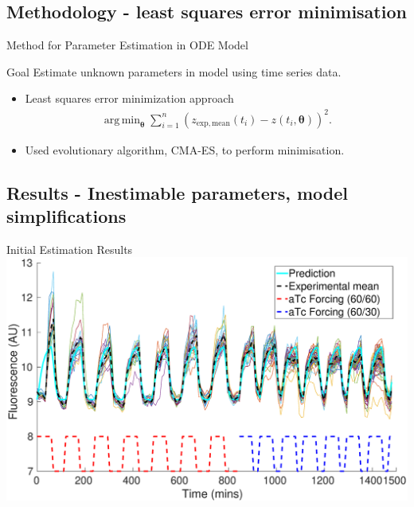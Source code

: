 \documentclass{beamer}
\DeclareMathOperator*{\argmin}{arg\,min}
\begin{document}
\subsection{Methodology - least squares error minimisation}

\begin{frame}{Method for Parameter Estimation in ODE Model}
  \begin{block}{Goal}
 Estimate unknown parameters in model using time series data.
    \end{block}
    
      \begin{itemize}
    \item  Least squares error minimization approach
    \begin{align*}
\argmin_{\boldsymbol{\theta}} \sum_{i =1}^{n} (z_{\mathrm{exp, mean}}(t_{i}) - z(t_{i},\boldsymbol{\theta}))^2.
\end{align*}
\item Used evolutionary algorithm, CMA-ES, to perform minimisation.
    \end{itemize}
\end{frame}

\subsection{Results - Inestimable parameters, model simplifications}

\begin{frame}{Initial Estimation Results}
  \includegraphics[scale = 0.28, clip = true, trim = 80 0 0 0]{Figures/13_9_bestPlot}
\end{frame}
\end{document}
